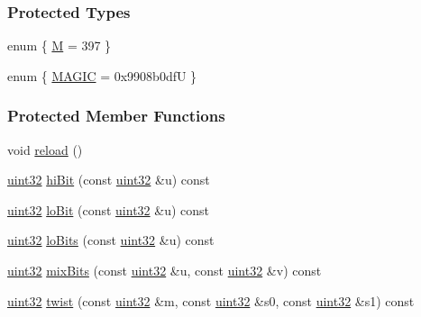 \subsubsection*{Protected Types}
\begin{DoxyCompactItemize}
\item 
enum \{ \hyperlink{class_m_t_rand_a10c3437be98225f5b0beee1ed8c033c8a133070000b798889cd75535ea0d5bb71}{M} =  397
 \}
\item 
enum \{ \hyperlink{class_m_t_rand_a60fd88469207f761aef84c3fc57c04a3a96b50a7ca844c42f49fc8aaeedebdc2a}{MAGIC} =  0x9908b0dfU
 \}
\end{DoxyCompactItemize}
\subsubsection*{Protected Member Functions}
\begin{DoxyCompactItemize}
\item 
void \hyperlink{class_m_t_rand_a1d5fcb69d83f4d2fd653883c8352f86c}{reload} ()
\item 
\hyperlink{class_m_t_rand_a45478edf9e24dcd2a5164bac3889d6a2}{uint32} \hyperlink{class_m_t_rand_a0f44969adf5a2991ad73b8bc4608c5c7}{hiBit} (const \hyperlink{class_m_t_rand_a45478edf9e24dcd2a5164bac3889d6a2}{uint32} \&u) const 
\item 
\hyperlink{class_m_t_rand_a45478edf9e24dcd2a5164bac3889d6a2}{uint32} \hyperlink{class_m_t_rand_a440ff2c31889aa6dde5babbe862a9e14}{loBit} (const \hyperlink{class_m_t_rand_a45478edf9e24dcd2a5164bac3889d6a2}{uint32} \&u) const 
\item 
\hyperlink{class_m_t_rand_a45478edf9e24dcd2a5164bac3889d6a2}{uint32} \hyperlink{class_m_t_rand_a9032b296e470bed53280a452e55203b7}{loBits} (const \hyperlink{class_m_t_rand_a45478edf9e24dcd2a5164bac3889d6a2}{uint32} \&u) const 
\item 
\hyperlink{class_m_t_rand_a45478edf9e24dcd2a5164bac3889d6a2}{uint32} \hyperlink{class_m_t_rand_ae7eb1282079e30b0a4a526cb86f8c2a2}{mixBits} (const \hyperlink{class_m_t_rand_a45478edf9e24dcd2a5164bac3889d6a2}{uint32} \&u, const \hyperlink{class_m_t_rand_a45478edf9e24dcd2a5164bac3889d6a2}{uint32} \&v) const 
\item 
\hyperlink{class_m_t_rand_a45478edf9e24dcd2a5164bac3889d6a2}{uint32} \hyperlink{class_m_t_rand_af1219020248cb80b772d64e2b6151a9c}{twist} (const \hyperlink{class_m_t_rand_a45478edf9e24dcd2a5164bac3889d6a2}{uint32} \&m, const \hyperlink{class_m_t_rand_a45478edf9e24dcd2a5164bac3889d6a2}{uint32} \&s0, const \hyperlink{class_m_t_rand_a45478edf9e24dcd2a5164bac3889d6a2}{uint32} \&s1) const 
\end{DoxyCompactItemize}
